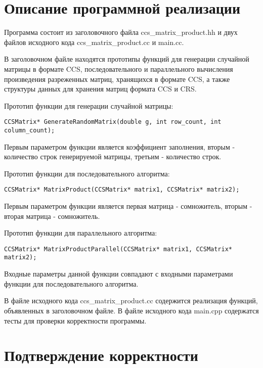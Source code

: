 \documentclass{report}
\begin{document}
\section*{Описание программной реализации}

\par Программа состоит из заголовочного файла ccs\_matrix\_product.hh и двух файлов исходного кода ccs\_matrix\_product.cc и main.cc.
\par В заголовочном файле находятся прототипы функций для генерации случайной матрицы в формате CCS, последовательного и параллельного вычисления произведения разреженных матриц, хранящихся в формате CCS, а также структуры данных для хранения матриц формата CCS и CRS.
\par Прототип функции для генерации случайной матрицы:
\begin{lstlisting}
CCSMatrix* GenerateRandomMatrix(double g, int row_count, int column_count);
\end{lstlisting}
Первым параметром функции является коэффициент заполнения, вторым - количество строк генерируемой матрицы, третьим - количество строк.
\par Прототип функции для последовательного алгоритма:
\begin{lstlisting}
CCSMatrix* MatrixProduct(CCSMatrix* matrix1, CCSMatrix* matrix2);
\end{lstlisting}
Первым параметром функции является первая матрица - сомножитель, вторым - вторая матрица - сомножитель.
\par Прототип функции для параллельного алгоритма:
\begin{lstlisting}
CCSMatrix* MatrixProductParallel(CCSMatrix* matrix1, CCSMatrix* matrix2);
\end{lstlisting}
Входные параметры данной функции совпадают с входными параметрами функции для последовательного алгоритма.
\par В файле исходного кода ccs\_matrix\_product.cc содержится реализация функций, объявленных в заголовочном файле. В файле исходного кода main.cpp содержатся тесты для проверки корректности программы.

\clearpage

\section*{Подтверждение корректности}
\end{document}
